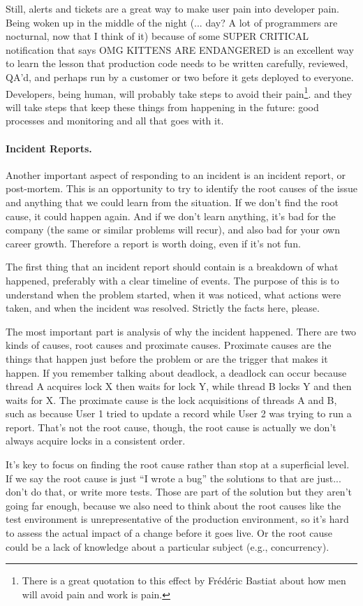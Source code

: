 \documentclass[a4paper]{report}
\begin{document}
Still, alerts and tickets are a great way to make user pain into developer pain. Being woken up in the middle of the night (... day? A lot of programmers are nocturnal, now that I think of it) because of some SUPER CRITICAL notification that says OMG KITTENS ARE ENDANGERED is an excellent way to learn the lesson that production code needs to be written carefully, reviewed, QA'd, and perhaps run by a customer or two before it gets deployed to everyone. Developers, being human, will probably take steps to avoid their pain\footnote{There is a great quotation to this effect by Fr\'ed\'eric Bastiat about how men will avoid pain and work is pain.}. and they will take steps that keep these things from happening in the future: good processes and monitoring and all that goes with it.

\paragraph{Incident Reports.} 
Another important aspect of responding to an incident is an incident report, or post-mortem. This is an opportunity to try to identify the root causes of the issue and anything that we could learn from the situation.  If we don't find the root cause, it could happen again. And if we don't learn anything, it's bad for the company (the same or similar problems will recur), and also bad for your own career growth. Therefore a report is worth doing, even if it's not fun.

The first thing that an incident report should contain is a breakdown of what happened, preferably with a clear timeline of events. The purpose of this is to understand when the problem started, when it was noticed, what actions were taken, and when the incident was resolved. Strictly the facts here, please.

The most important part is analysis of why the incident happened. There are two kinds of causes, root causes and proximate causes. Proximate causes are the things that happen just before the problem or are the trigger that makes it happen. If you remember talking about deadlock, a deadlock can occur because thread A acquires lock X then waits for lock Y, while thread B locks Y and then waits for X. The proximate cause is the lock acquisitions of threads A and B, such as because User 1 tried to update a record while User 2 was trying to run a report. That's not the root cause, though, the root cause is actually we don't always acquire locks in a consistent order.

It's key to focus on finding the root cause rather than stop at a superficial level. If we say the root cause is just ``I wrote a bug'' the solutions to that are just... don't do that, or write more tests. Those are part of the solution but they aren't going far enough, because we also need to think about the root causes like the test environment is unrepresentative of the production environment, so it's hard to assess the actual impact of a change before it goes live. Or the root cause could be a lack of knowledge about a particular subject (e.g., concurrency). 
\end{document}
